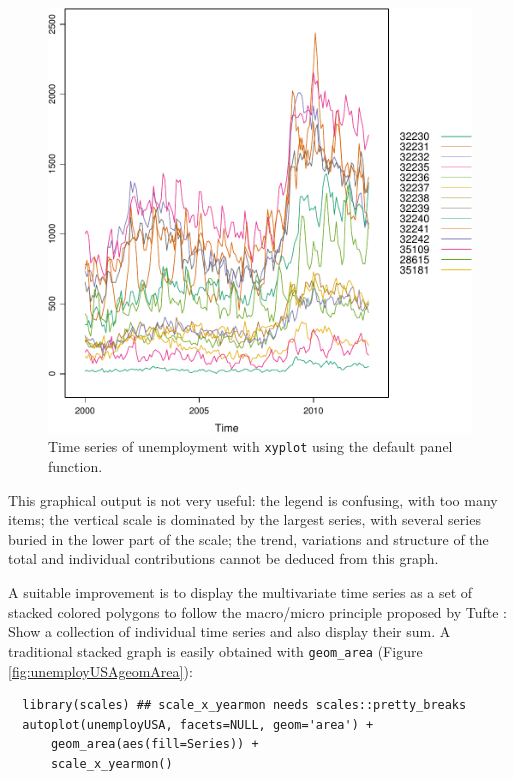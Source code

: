 \documentclass[smallroyalvopaper]{memoir}
\begin{document}
\begin{figure}[htbp]
\centering
\includegraphics[width=.9\linewidth]{figs/unemployUSAxyplot.pdf}
\caption{Time series of unemployment  with \texttt{xyplot} using the default panel function. \label{fig:unemployUSAxyplot}}
\end{figure}

This graphical output is not very useful: the legend is confusing,
with too many items; the vertical scale is dominated by the largest
series, with several series buried in the lower part of the scale; the
trend, variations and structure of the total and individual
contributions cannot be deduced from this graph.

A suitable improvement is to display the multivariate time series as a
set of stacked colored polygons to follow the macro/micro principle
proposed by Tufte \cite{Tufte1990}: Show a collection of individual
time series and also display their sum. A traditional stacked graph is
easily obtained with \texttt{geom\_area} (Figure \ref{fig:unemployUSAgeomArea}):

\lstset{language=r,label= ,caption= ,captionpos=b,numbers=none}
\begin{lstlisting}
  library(scales) ## scale_x_yearmon needs scales::pretty_breaks
  autoplot(unemployUSA, facets=NULL, geom='area') +
      geom_area(aes(fill=Series)) +
      scale_x_yearmon()  
\end{lstlisting}
\end{document}
